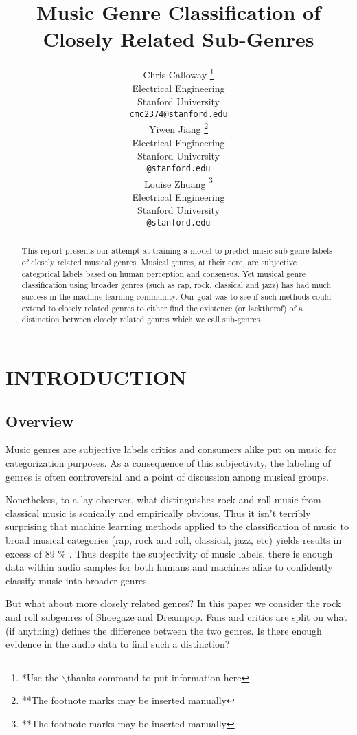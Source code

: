 \documentclass[letterpaper, 12 pt, conference]{ieeeconf}  %
\title{\LARGE \bf
Music Genre Classification of Closely Related Sub-Genres 
}
\author{ \parbox{2 in}{\centering Chris Calloway
        \thanks{*Use the $\backslash$thanks command to put information here}\\
        Electrical Engineering\\
       Stanford University\\
        {\tt\small cmc2374@stanford.edu}}
        \hspace*{ 0.5 in}
        \parbox{2 in}{ \centering Yiwen Jiang
        \thanks{**The footnote marks may be inserted manually}\\
        Electrical Engineering \\
        Stanford University\\
        {\tt\small @stanford.edu}}
          \hspace*{ 0.5 in}
        \parbox{2 in}{ \centering Louise Zhuang
        \thanks{**The footnote marks may be inserted manually}\\
        Electrical Engineering \\
        Stanford University\\
        {\tt\small @stanford.edu}}
}
\begin{document}
\maketitle
\thispagestyle{empty}
\pagestyle{empty}


\begin{abstract}

This report presents our attempt at training a model to predict music sub-genre labels of closely related musical genres. Musical genres, at their core, are subjective categorical labels based on human perception and consensus. Yet musical genre classification using broader genres (such as rap, rock, classical and jazz) has had much success in the machine learning community. Our goal was to see if such methods could extend to closely related genres to either find the existence (or lacktherof) of a distinction between closely related genres which we call sub-genres.




\end{abstract}


\section{INTRODUCTION}

\subsection{Overview}

Music genres are subjective labels critics and consumers alike put on music for categorization purposes. 
As a consequence of this subjectivity, the labeling of genres is often controversial and a point of discussion among musical groups. 

Nonetheless, to a lay observer, what distinguishes rock and roll music from classical music is sonically and empirically obvious. Thus it isn't terribly surprising that machine learning methods applied to the classification of music to broad musical categories (rap, rock and roll, classical, jazz, etc) yields results in excess of 89 \% \cite{c1} \cite{c2} \cite{c3}. Thus despite the subjectivity of music labels, there is enough data within audio samples for both humans and machines alike to confidently classify music into broader genres.

But what about more closely related genres? In this paper we consider the rock and roll subgenres of Shoegaze and Dreampop. Fans and critics are split on what (if anything) defines the difference between the two genres. Is there enough evidence in the audio data to find such a distinction? 
\end{document}

